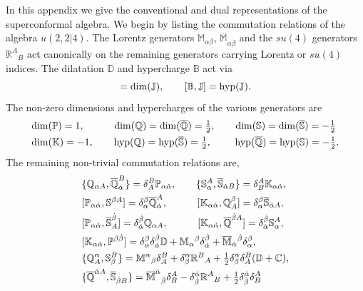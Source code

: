 \documentclass[12pt]{article}
\def \be  {\begin{equation}}
\def \ee  {\end{equation}}
\def \qqquad {\qquad\quad}
\renewcommand{\a}{\alpha}
\newcommand{\da}{{\dot{\alpha}}}
\newcommand{\db}{{\dot{\beta}}}
\renewcommand{\b}{\beta}
\begin{document}
{In this appendix we give the conventional and dual representations of the superconformal algebra. We
begin by listing the commutation relations of the algebra $u(2,2|4)$. The Lorentz generators
$\mathbb{M}_{\a \b}$, $\overline{\mathbb{M}}_{\da \db}$ and the $su(4)$ generators
$\mathbb{R}^{A}{}_{B}$ act canonically on the remaining generators carrying Lorentz or $su(4)$
indices. The dilatation $\mathbb{D}$ and hypercharge $\mathbb{B}$ act via
\be
[\mathbb{D},\mathbb{J}] = {\rm dim}(\mathbb{J}), \qquad [\mathbb{B},\mathbb{J}] = {\rm
hyp}(\mathbb{J}).
\ee
The non-zero dimensions and hypercharges of the various generators are
\begin{align} \notag
& {\rm dim}(\mathbb{P})=1, \qqquad {\rm dim}(\mathbb{Q}) = {\rm dim}(\overline{\mathbb{Q}}) =
\tfrac{1}{2},\qquad {\rm dim}(\mathbb{S}) = {\rm dim}(\overline{\mathbb{S}}) = -\tfrac{1}{2}
\\
&{\rm dim}(\mathbb{K})=-1,\qquad {\rm hyp}(\mathbb{Q}) = {\rm hyp}(\overline{\mathbb{S}}) =
\tfrac{1}{2}, \qquad~ {\rm hyp}(\overline{\mathbb{Q}}) = {\rm hyp}(\mathbb{S}) = - \tfrac{1}{2}.
\end{align}
The remaining non-trivial commutation relations are,
\begin{align} \notag
& \{\mathbb{Q}_{\a A},\overline{\mathbb{Q}}_{\da}^B\}  =  \delta_A^B \mathbb{P}_{\a \da},
   \qquad \{\mathbb{S}_{\a}^A,\overline{\mathbb{S}}_{\da B} \} = \delta_B^A \mathbb{K}_{\a \da},
\\ \notag
& {}[\mathbb{P}_{\a \da},\mathbb{S}^{\b A}] = \delta_{\a}^{\b} \overline{\mathbb{Q}}_{\da}^A,
 \qqquad [\mathbb{K}_{\a \da},\mathbb{Q}^{\b}_{A}] = \delta_{\a}^{\b}
   \overline{\mathbb{S}}_{\da A},
\\ \notag
& {}[\mathbb{P}_{\a \da},\overline{\mathbb{S}}^{\db}_{A}]  =  \delta^{\db}_{\da} \mathbb{Q}_{\a A},
\qqquad [\mathbb{K}_{\a \da}, \overline{\mathbb{Q}}^{\db A}]  =  \delta_{\da}^{\db} \mathbb{S}_{\a}^{A},
\\ \notag
& [\mathbb{K}_{\a \da},\mathbb{P}^{\b \db}] = \delta_\a^\b \delta_\da^\db \mathbb{D} +
\mathbb{M}_{\a}{}^{\b}
 \delta_\da^\db + \overline{\mathbb{M}}_{\da}{}^{\db} \delta_\a^\b,
\\ \notag
& \{\mathbb{Q}^{\a}_{A},\mathbb{S}_\b^B\} =  \mathbb{M}^{\a}{}_{\b}
\delta_A^B + \delta^{\a}_{\b} \mathbb{R}^{B}{}_{A} + \tfrac{1}{2}\delta^{\a}_{\b} \delta_A^B (\mathbb{D}+\mathbb{C}),
\\ \label{comm-rel}
& \{\overline{\mathbb{Q}}^{\da A},\overline{\mathbb{S}}_{\db B}\} = \overline{\mathbb{M}}^{\da}{}_{\db} \delta_B^A  - \delta^{\da}_{\db} \mathbb{R}^{A}{}_{B} + \tfrac{1}{2} \delta^{\da}_{\db}\delta_B^A

\end{align}}
\end{document}
